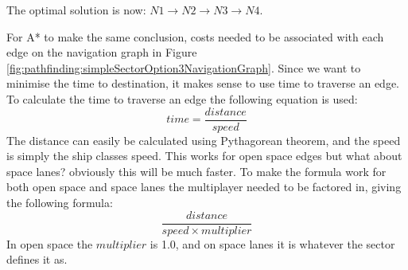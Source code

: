 The optimal solution is now: $N1 \to N2 \to N3 \to N4$.

For A* to make the same conclusion, costs needed to be associated with each edge on the navigation graph in Figure \ref{fig:pathfinding:simpleSectorOption3NavigationGraph}.
Since we want to minimise the time to destination, it makes sense to use time to traverse an edge.
To calculate the time to traverse an edge the following equation is used:
$$ time = \frac{distance}{speed} $$
The distance can easily be calculated using Pythagorean theorem, and the speed is simply the ship classes speed.
This works for open space edges but what about space lanes? obviously this will be much faster.
To make the formula work for both open space and space lanes the multiplayer needed to be factored in, giving the following formula:
$$ \frac{distance}{speed \times multiplier} $$
In open space the $multiplier$ is 1.0, and on space lanes it is whatever the sector defines it as.






